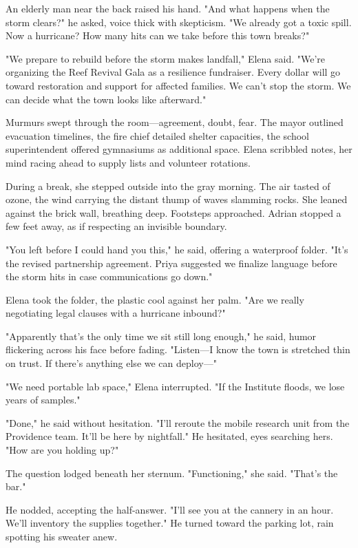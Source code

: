 An elderly man near the back raised his hand. "And what happens when the storm clears?" he asked, voice thick with skepticism. "We already got a toxic spill. Now a hurricane? How many hits can we take before this town breaks?"

"We prepare to rebuild before the storm makes landfall," Elena said. "We're organizing the Reef Revival Gala as a resilience fundraiser. Every dollar will go toward restoration and support for affected families. We can't stop the storm. We can decide what the town looks like afterward."

Murmurs swept through the room—agreement, doubt, fear. The mayor outlined evacuation timelines, the fire chief detailed shelter capacities, the school superintendent offered gymnasiums as additional space. Elena scribbled notes, her mind racing ahead to supply lists and volunteer rotations.

During a break, she stepped outside into the gray morning. The air tasted of ozone, the wind carrying the distant thump of waves slamming rocks. She leaned against the brick wall, breathing deep. Footsteps approached. Adrian stopped a few feet away, as if respecting an invisible boundary.

"You left before I could hand you this," he said, offering a waterproof folder. "It's the revised partnership agreement. Priya suggested we finalize language before the storm hits in case communications go down."

Elena took the folder, the plastic cool against her palm. "Are we really negotiating legal clauses with a hurricane inbound?"

"Apparently that's the only time we sit still long enough," he said, humor flickering across his face before fading. "Listen—I know the town is stretched thin on trust. If there's anything else we can deploy—"

"We need portable lab space," Elena interrupted. "If the Institute floods, we lose years of samples."

"Done," he said without hesitation. "I'll reroute the mobile research unit from the Providence team. It'll be here by nightfall." He hesitated, eyes searching hers. "How are you holding up?"

The question lodged beneath her sternum. "Functioning," she said. "That's the bar."

He nodded, accepting the half-answer. "I'll see you at the cannery in an hour. We'll inventory the supplies together." He turned toward the parking lot, rain spotting his sweater anew.

